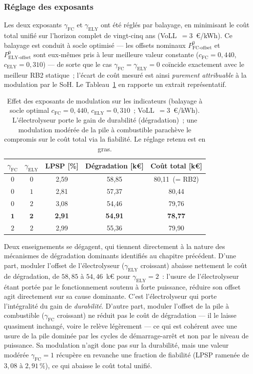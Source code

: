 \subsubsection{Réglage des exposants}
\label{subsec:rb2soh_tuning}

Les deux exposants $\gamma_{\text{FC}}$ et $\gamma_{\text{ELY}}$ ont été réglés par balayage, en minimisant le coût total unifié sur l'horizon complet de vingt-cinq ans (VoLL~$=3$~€/kWh). Ce balayage est conduit à socle optimisé — les offsets nominaux $P_{\text{FC-offset}}^{0}$ et $P_{\text{ELY-offset}}^{0}$ sont eux-mêmes pris à leur meilleure valeur constante ($c_{\text{FC}} = 0{,}440$, $c_{\text{ELY}} = 0{,}310$) — de sorte que le cas $\gamma_{\text{FC}} = \gamma_{\text{ELY}} = 0$ coïncide exactement avec le meilleur RB2 statique~; l'écart de coût mesuré est ainsi \emph{purement attribuable} à la modulation par le SoH. Le Tableau~\ref{tab:rb2soh_gamma} en rapporte un extrait représentatif.

\begin{table}[h!]
\centering
\caption{Effet des exposants de modulation sur les indicateurs (balayage à socle optimal $c_{\text{FC}} = 0{,}440$, $c_{\text{ELY}} = 0{,}310$~; VoLL~$=3$~€/kWh). L'électrolyseur porte le gain de durabilité (dégradation)~; une modulation modérée de la pile à combustible parachève le compromis sur le coût total via la fiabilité. Le réglage retenu est en gras.}
\label{tab:rb2soh_gamma}
\begin{tabular}{ccccc}
\hline
$\gamma_{\text{FC}}$ & $\gamma_{\text{ELY}}$ & LPSP [\%] & Dégradation [k€] & Coût total [k€] \\
\hline
$0$ & $0$ & 2,59 & 58,85 & 80,11~(= RB2) \\
$0$ & $1$ & 2,81 & 57,37 & 80,44 \\
$0$ & $2$ & 3,08 & 54,46 & 79,76 \\
$\mathbf{1}$ & $\mathbf{2}$ & \textbf{2,91} & \textbf{54,91} & \textbf{78,77} \\
$2$ & $2$ & 2,99 & 55,36 & 79,90 \\
\hline
\end{tabular}
\end{table}

Deux enseignements se dégagent, qui tiennent directement à la nature des mécanismes de dégradation dominants identifiés au chapitre précédent. D'une part, moduler l'offset de l'électrolyseur ($\gamma_{\text{ELY}}$ croissant) abaisse nettement le coût de dégradation, de $58{,}85$ à $54{,}46$~k€ pour $\gamma_{\text{ELY}} = 2$~: l'usure de l'électrolyseur étant portée par le fonctionnement soutenu à forte puissance, réduire son offset agit directement sur sa cause dominante. C'est l'électrolyseur qui porte l'intégralité du gain de \emph{durabilité}. D'autre part, moduler l'offset de la pile à combustible ($\gamma_{\text{FC}}$ croissant) ne réduit pas le coût de dégradation — il le laisse quasiment inchangé, voire le relève légèrement — ce qui est cohérent avec une usure de la pile dominée par les cycles de démarrage-arrêt et non par le niveau de puissance. Sa modulation n'agit donc pas sur la durabilité, mais une valeur modérée $\gamma_{\text{FC}} = 1$ récupère en revanche une fraction de fiabilité (LPSP ramenée de $3{,}08$ à $2{,}91\,\%$), ce qui abaisse le coût total unifié.

